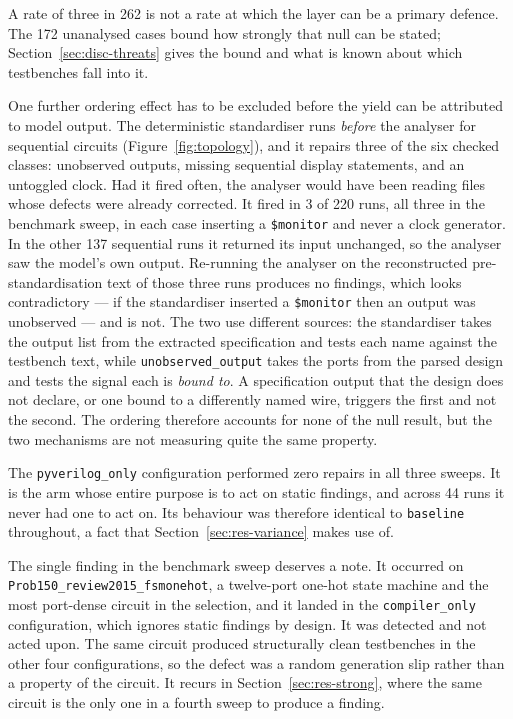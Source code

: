 \documentclass[11pt,a4paper,titlepage=false]{scrreprt}
\begin{document}
A rate of three in 262 is not a rate at which the layer can be a primary defence. The 172
unanalysed cases bound how strongly that null can be stated;
Section~\ref{sec:disc-threats} gives the bound and what is known about which testbenches
fall into it.

One further ordering effect has to be excluded before the yield can be attributed to model
output. The deterministic standardiser runs \emph{before} the analyser for sequential
circuits (Figure~\ref{fig:topology}), and it repairs three of the six checked classes:
unobserved outputs, missing sequential display statements, and an untoggled clock. Had it
fired often, the analyser would have been reading files whose defects were already corrected.
It fired in 3 of 220 runs, all three in the benchmark sweep, in each case inserting a
\texttt{\$monitor} and never a clock generator. In the other 137 sequential runs it returned
its input unchanged, so the analyser saw the model's own output. Re-running the analyser on
the reconstructed pre-standardisation text of those three runs produces no findings, which
looks contradictory --- if the standardiser inserted a \texttt{\$monitor} then an output was
unobserved --- and is not. The two use different sources: the standardiser takes the output
list from the extracted specification and tests each name against the testbench text, while
\texttt{unobserved\_output} takes the ports from the parsed design and tests the signal each
is \emph{bound to}. A specification output that the design does not declare, or one bound to
a differently named wire, triggers the first and not the second. The ordering therefore
accounts for none of the null result, but the two mechanisms are not measuring quite the same
property.

The \texttt{pyverilog\_only} configuration performed zero repairs in all three sweeps. It
is the arm whose entire purpose is to act on static findings, and across 44 runs it never
had one to act on. Its behaviour was therefore identical to \texttt{baseline} throughout,
a fact that Section~\ref{sec:res-variance} makes use of.

The single finding in the benchmark sweep deserves a note. It occurred on
\texttt{Prob150\_\allowbreak review2015\_\allowbreak fsmonehot}, a twelve-port one-hot state
machine and the most
port-dense circuit in the selection, and it landed in the \texttt{compiler\_only}
configuration, which ignores static findings by design. It was detected and not acted upon.
The same circuit produced structurally clean testbenches in the other four configurations,
so the defect was a random generation slip rather than a property of the circuit. It recurs
in Section~\ref{sec:res-strong}, where the same circuit is the only one in a fourth sweep to
produce a finding.
\end{document}
